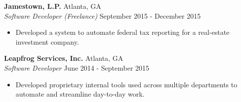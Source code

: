 \documentclass[a4paper]{article}
\begin{document}
\textbf{Jamestown, L.P.} \hfill Atlanta, GA\\
\textit{Software Developer (Freelance)} \hfill September 2015 - December 2015\\
\vspace{-1mm}
\begin{itemize} \itemsep 1pt
	\item Developed a system to automate federal tax reporting for a real-estate investment company.
\end{itemize}
\textbf{Leapfrog Services, Inc.} \hfill Atlanta, GA\\
\textit{Software Developer} \hfill June 2014 - September 2015\\
\vspace{-1mm}
\begin{itemize} \itemsep 1pt
	\item Developed proprietary internal tools used across multiple departments to automate and streamline day-to-day work.
\end{itemize}
\end{document}
